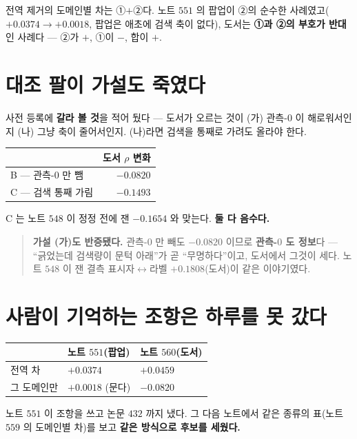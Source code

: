 \documentclass[11pt]{article}
\begin{document}
전역 제거의 도메인별 차는 ①$+$②다. 노트 $551$ 의 팝업이 ②의 순수한
사례였고($+0.0374 \to +0.0018$, 팝업은 애초에 검색 축이 없다), 도서는
\textbf{①과 ②의 부호가 반대}인 사례다 --- ②가 $+$, ①이 $-$, 합이 $+$.

\section{대조 팔이 가설도 죽였다}

사전 등록에 \textbf{갈라 볼 것}을 적어 뒀다 --- 도서가 오르는 것이 (가)
관측-$0$ 이 해로워서인지 (나) 그냥 축이 줄어서인지. (나)라면 검색을 통째로
가려도 올라야 한다.

\begin{center}
\begin{tabular}{lr}
\hline
 & 도서 $\rho$ 변화 \\
\hline
B --- 관측-$0$ 만 뺌 & $-0.0820$ \\
C --- 검색 통째 가림 & $-0.1493$ \\
\hline
\end{tabular}
\end{center}

C 는 노트 $548$ 이 정정 전에 잰 $-0.1654$ 와 맞는다. \textbf{둘 다 음수다.}

\begin{quote}
\textbf{가설 (가)도 반증됐다.} 관측-$0$ 만 빼도 $-0.0820$ 이므로
\textbf{관측-$0$ 도 정보}다 --- ``긁었는데 검색량이 문턱 아래''가 곧
``무명하다''이고, 도서에서 그것이 세다. 노트 $548$ 이 잰 결측
표시자$\leftrightarrow$라벨 $+0.1808$(도서)이 같은 이야기였다.
\end{quote}

\section{사람이 기억하는 조항은 하루를 못 갔다}

\begin{center}
\begin{tabular}{lll}
\hline
 & 노트 $551$(팝업) & 노트 $560$(도서) \\
\hline
전역 차 & $+0.0374$ & $+0.0459$ \\
그 도메인만 & $+0.0018$ (문다) & $\mathbf{-0.0820}$ \\
\hline
\end{tabular}
\end{center}

노트 $551$ 이 조항을 쓰고 논문 $432$ 까지 냈다. 그 다음 노트에서 같은 종류의
표(노트 $559$ 의 도메인별 차)를 보고 \textbf{같은 방식으로 후보를 세웠다.}
\end{document}
